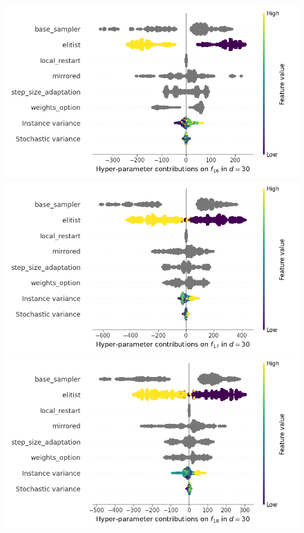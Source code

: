 \begin{figure}[t]
	\includegraphics[height=0.15\textheight,trim=60mm 0mm 0mm 0mm,clip]{images/img_summary_f16_d30.png}
	\includegraphics[height=0.15\textheight,trim=0mm 0mm 30mm 0mm,clip]{images/img_summary_f17_d30.png}
	\includegraphics[height=0.15\textheight,trim=60mm 0mm 30mm 0mm,clip]{images/img_summary_f18_d30.png}

\end{figure}

